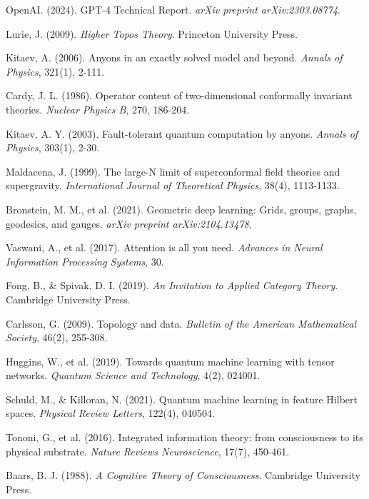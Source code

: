 \documentclass[11pt]{article}
\begin{document}
\begin{thebibliography}{99}

OpenAI. (2024). GPT-4 Technical Report. \textit{arXiv preprint arXiv:2303.08774}.

Lurie, J. (2009). \textit{Higher Topos Theory}. Princeton University Press.

Kitaev, A. (2006). Anyons in an exactly solved model and beyond. \textit{Annals of Physics}, 321(1), 2-111.

Cardy, J. L. (1986). Operator content of two-dimensional conformally invariant theories. \textit{Nuclear Physics B}, 270, 186-204.

Kitaev, A. Y. (2003). Fault-tolerant quantum computation by anyons. \textit{Annals of Physics}, 303(1), 2-30.

Maldacena, J. (1999). The large-N limit of superconformal field theories and supergravity. \textit{International Journal of Theoretical Physics}, 38(4), 1113-1133.

Bronstein, M. M., et al. (2021). Geometric deep learning: Grids, groups, graphs, geodesics, and gauges. \textit{arXiv preprint arXiv:2104.13478}.

Vaswani, A., et al. (2017). Attention is all you need. \textit{Advances in Neural Information Processing Systems}, 30.

Fong, B., \& Spivak, D. I. (2019). \textit{An Invitation to Applied Category Theory}. Cambridge University Press.

Carlsson, G. (2009). Topology and data. \textit{Bulletin of the American Mathematical Society}, 46(2), 255-308.

Huggins, W., et al. (2019). Towards quantum machine learning with tensor networks. \textit{Quantum Science and Technology}, 4(2), 024001.

Schuld, M., \& Killoran, N. (2021). Quantum machine learning in feature Hilbert spaces. \textit{Physical Review Letters}, 122(4), 040504.

Tononi, G., et al. (2016). Integrated information theory: from consciousness to its physical substrate. \textit{Nature Reviews Neuroscience}, 17(7), 450-461.

Baars, B. J. (1988). \textit{A Cognitive Theory of Consciousness}. Cambridge University Press.


\end{thebibliography}
\end{document}
